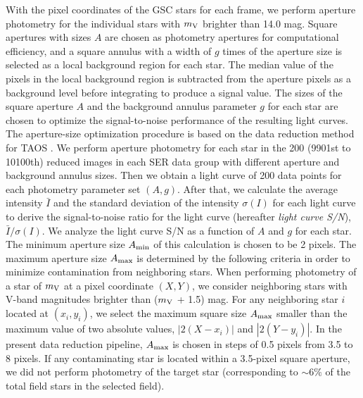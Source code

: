 \documentclass{pasj01}
\begin{document}
With the pixel coordinates of the GSC stars for each frame, 
we perform aperture photometry for the individual stars
with $m_{\rm V}$ brighter than 14.0 mag. 
Square apertures with sizes $A$ are chosen as photometry apertures
for computational efficiency, 
and a square annulus with a width of $g$ times of the aperture size
is selected as a local background region for each star.
The median value of the pixels in the local background region 
is subtracted from the aperture pixels as a background level
before integrating to produce a signal value. 
%
The sizes of the square aperture $A$ and the background annulus parameter $g$ for each star
are chosen to optimize the signal-to-noise performance of the resulting light curves.
The aperture-size optimization procedure is 
based on the data reduction method for TAOS \citep{zhang09}.
We perform aperture photometry for each star 
in the 200 (9901st to 10100th) reduced images  in each SER data group
with different aperture and background annulus sizes.
Then we obtain a light curve of 200 data points for each photometry parameter set $(A, g)$.
After that, we calculate the average intensity $\bar{I}$ 
and the standard deviation of the intensity $\sigma (I) $ for each light curve
to derive the signal-to-noise ratio for the light curve (hereafter {\it light curve S/N}), 
$\bar{I}/\sigma (I)$.
We analyze the light curve S/N
as a function of $A$ and $g$ for each star.
The minimum aperture size $A_{\rm min}$ of this calculation is chosen to be 2 pixels.
The maximum aperture size $A_{\rm max}$ is determined by the following criteria
in order to minimize contamination from neighboring stars.
When performing photometry of a star of $m_{\rm V}$ at a pixel coordinate $(X, Y)$, 
we consider neighboring stars with V-band magnitudes brighter than ($m_{\rm V}$ + 1.5) mag. 
For any neighboring star $i$ located at $(x_i,y_i)$,
we select the maximum square size $A_{\rm max}$ 
smaller than the maximum value of two absolute values, $|2(X - x_i)|$ and $|2(Y - y_i)|$.
In the present data reduction pipeline,
$A_{\rm max}$ is chosen in steps of 0.5 pixels from 3.5 to 8 pixels.
If any contaminating star is located within a 3.5-pixel square aperture, 
we did not perform photometry of the target star 
(corresponding to $\sim 6\%$ of the total field stars in the selected field). 
\end{document}
